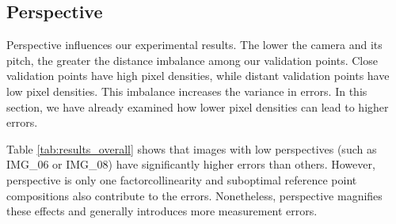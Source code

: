 \subsection{Perspective}
Perspective influences our experimental results. The lower the camera and its 
pitch, the greater the distance imbalance among our 
validation points. Close validation points have high pixel densities, while 
distant validation points have low pixel densities. This imbalance increases 
the variance in errors. In this section, we have already examined how 
lower pixel densities can lead to higher errors.

Table \ref{tab:results_overall} shows that images with low 
perspectives (such as IMG\_06 or IMG\_08) have significantly 
higher errors than others. However, perspective is only one 
factor\textemdash collinearity and suboptimal reference point compositions 
also contribute to the errors. Nonetheless, perspective magnifies 
these effects and generally introduces more measurement errors.

